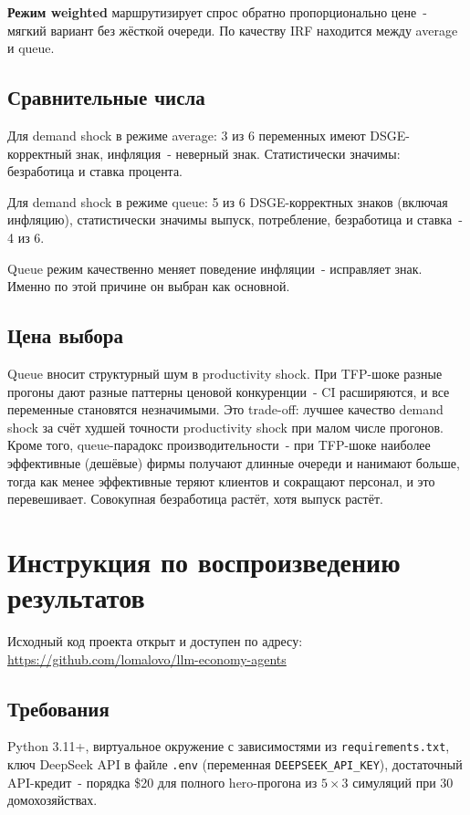 \documentclass[12pt, a4paper]{article}
\begin{document}
\textbf{Режим weighted} маршрутизирует спрос обратно пропорционально цене~- мягкий вариант без жёсткой очереди. По качеству IRF находится между average и queue.

\subsection{Сравнительные числа}

Для demand shock в режиме average: 3 из 6 переменных имеют DSGE-корректный знак, инфляция~- неверный знак. Статистически значимы: безработица и ставка процента.

Для demand shock в режиме queue: 5 из 6 DSGE-корректных знаков (включая инфляцию), статистически значимы выпуск, потребление, безработица и ставка~- 4 из 6.

Queue режим качественно меняет поведение инфляции~- исправляет знак. Именно по этой причине он выбран как основной.

\subsection{Цена выбора}

Queue вносит структурный шум в productivity shock. При TFP-шоке разные прогоны дают разные паттерны ценовой конкуренции~- CI расширяются, и все переменные становятся незначимыми. Это trade-off: лучшее качество demand shock за счёт худшей точности productivity shock при малом числе прогонов. Кроме того, queue-парадокс производительности~- при TFP-шоке наиболее эффективные (дешёвые) фирмы получают длинные очереди и нанимают больше, тогда как менее эффективные теряют клиентов и сокращают персонал, и это перевешивает. Совокупная безработица растёт, хотя выпуск растёт.

\section{Инструкция по воспроизведению результатов}

Исходный код проекта открыт и доступен по адресу:\\
\url{https://github.com/lomalovo/llm-economy-agents}

\subsection{Требования}

Python 3.11+, виртуальное окружение с зависимостями из \texttt{requirements.txt}, ключ DeepSeek API в файле \texttt{.env} (переменная \texttt{DEEPSEEK\_API\_KEY}), достаточный API-кредит~- порядка \$20 для полного hero-прогона из $5 \times 3$ симуляций при 30 домохозяйствах.
\end{document}

